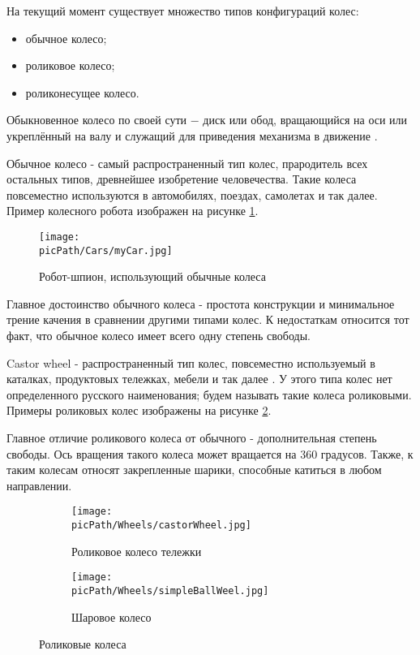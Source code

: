 \documentclass[oneside,final,14pt]{extreport}
\newcommand{\picPath}{img}
\newcommand{\cmmnt}[1]{\ignorespaces}
\begin{document}
На текущий момент существует множество типов конфигураций колес:
\begin{itemize}
\item обычное колесо;
\item роликовое колесо;
\item роликонесущее колесо.
\end{itemize}

Обыкновенное колесо по своей сути $-$ диск или обод, вращающийся на оси или укреплённый на валу и служащий для приведения механизма в движение \cite{Src:Ozhigov}.

Обычное колесо - самый распространенный тип колес, прародитель всех остальных типов, древнейшее изобретение человечества. Такие колеса повсеместно используются в автомобилях, поездах, самолетах и так далее. Пример колесного робота изображен на рисунке \ref{Figure:myCar}.
  
\begin{figure}[H]
\begin{center}
\texttt{[image: \\picPath/Cars/myCar.jpg]}
\end{center}
  \caption{ Робот-шпион, использующий обычные колеса}
  \label{Figure:myCar}
\end{figure}
Главное достоинство обычного колеса - простота конструкции и минимальное трение качения в сравнении другими типами колес. К недостаткам относится тот факт, что обычное колесо имеет всего одну степень свободы. \cmmnt{движение обычного колеса возможно только в направлениях, перпендикулярных оси вращения.}

Castor wheel - распространенный тип колес, повсеместно используемый в каталках, продуктовых тележках, мебели и так далее \cite{Src:Siegwart}. У этого типа колес нет определенного русского наименования; будем называть такие колеса роликовыми. Примеры роликовых колес изображены на рисунке \ref{Figure:CastorsWheels}.

Главное отличие роликового колеса от обычного - дополнительная степень свободы. Ось вращения такого колеса может вращается на $360$ градусов. Также, к таким колесам относят закрепленные шарики, способные катиться в любом направлении. 

\begin{figure}[H]
  \centering
  \begin{subfigure}[b]{0.4\linewidth}
   \texttt{[image: \\picPath/Wheels/castorWheel.jpg]}
    \caption{ Роликовое колесо тележки}
  \end{subfigure}
  \begin{subfigure}[b]{0.4\linewidth}
    \texttt{[image: \\picPath/Wheels/simpleBallWeel.jpg]}
    \caption{ Шаровое колесо }
  \end{subfigure}
  \caption{ Роликовые колеса}
  \label{Figure:CastorsWheels}
\end{figure}
\end{document}
